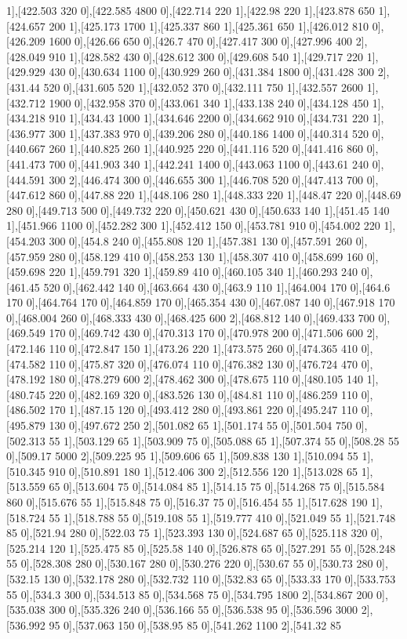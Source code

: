 {1],[422.503 320 0],[422.585 4800 0],[422.714 220 1],[422.98 220 1],[423.878 650 1],[424.657 200 1],[425.173 1700 1],[425.337 860 1],[425.361 650 1],[426.012 810 0],[426.209 1600 0],[426.66 650 0],[426.7 470 0],[427.417 300 0],[427.996 400 2],[428.049 910 1],[428.582 430 0],[428.612 300 0],[429.608 540 1],[429.717 220 1],[429.929 430 0],[430.634 1100 0],[430.929 260 0],[431.384 1800 0],[431.428 300 2],[431.44 520 0],[431.605 520 1],[432.052 370 0],[432.111 750 1],[432.557 2600 1],[432.712 1900 0],[432.958 370 0],[433.061 340 1],[433.138 240 0],[434.128 450 1],[434.218 910 1],[434.43 1000 1],[434.646 2200 0],[434.662 910 0],[434.731 220 1],[436.977 300 1],[437.383 970 0],[439.206 280 0],[440.186 1400 0],[440.314 520 0],[440.667 260 1],[440.825 260 1],[440.925 220 0],[441.116 520 0],[441.416 860 0],[441.473 700 0],[441.903 340 1],[442.241 1400 0],[443.063 1100 0],[443.61 240 0],[444.591 300 2],[446.474 300 0],[446.655 300 1],[446.708 520 0],[447.413 700 0],[447.612 860 0],[447.88 220 1],[448.106 280 1],[448.333 220 1],[448.47 220 0],[448.69 280 0],[449.713 500 0],[449.732 220 0],[450.621 430 0],[450.633 140 1],[451.45 140 1],[451.966 1100 0],[452.282 300 1],[452.412 150 0],[453.781 910 0],[454.002 220 1],[454.203 300 0],[454.8 240 0],[455.808 120 1],[457.381 130 0],[457.591 260 0],[457.959 280 0],[458.129 410 0],[458.253 130 1],[458.307 410 0],[458.699 160 0],[459.698 220 1],[459.791 320 1],[459.89 410 0],[460.105 340 1],[460.293 240 0],[461.45 520 0],[462.442 140 0],[463.664 430 0],[463.9 110 1],[464.004 170 0],[464.6 170 0],[464.764 170 0],[464.859 170 0],[465.354 430 0],[467.087 140 0],[467.918 170 0],[468.004 260 0],[468.333 430 0],[468.425 600 2],[468.812 140 0],[469.433 700 0],[469.549 170 0],[469.742 430 0],[470.313 170 0],[470.978 200 0],[471.506 600 2],[472.146 110 0],[472.847 150 1],[473.26 220 1],[473.575 260 0],[474.365 410 0],[474.582 110 0],[475.87 320 0],[476.074 110 0],[476.382 130 0],[476.724 470 0],[478.192 180 0],[478.279 600 2],[478.462 300 0],[478.675 110 0],[480.105 140 1],[480.745 220 0],[482.169 320 0],[483.526 130 0],[484.81 110 0],[486.259 110 0],[486.502 170 1],[487.15 120 0],[493.412 280 0],[493.861 220 0],[495.247 110 0],[495.879 130 0],[497.672 250 2],[501.082 65 1],[501.174 55 0],[501.504 750 0],[502.313 55 1],[503.129 65 1],[503.909 75 0],[505.088 65 1],[507.374 55 0],[508.28 55 0],[509.17 5000 2],[509.225 95 1],[509.606 65 1],[509.838 130 1],[510.094 55 1],[510.345 910 0],[510.891 180 1],[512.406 300 2],[512.556 120 1],[513.028 65 1],[513.559 65 0],[513.604 75 0],[514.084 85 1],[514.15 75 0],[514.268 75 0],[515.584 860 0],[515.676 55 1],[515.848 75 0],[516.37 75 0],[516.454 55 1],[517.628 190 1],[518.724 55 1],[518.788 55 0],[519.108 55 1],[519.777 410 0],[521.049 55 1],[521.748 85 0],[521.94 280 0],[522.03 75 1],[523.393 130 0],[524.687 65 0],[525.118 320 0],[525.214 120 1],[525.475 85 0],[525.58 140 0],[526.878 65 0],[527.291 55 0],[528.248 55 0],[528.308 280 0],[530.167 280 0],[530.276 220 0],[530.67 55 0],[530.73 280 0],[532.15 130 0],[532.178 280 0],[532.732 110 0],[532.83 65 0],[533.33 170 0],[533.753 55 0],[534.3 300 0],[534.513 85 0],[534.568 75 0],[534.795 1800 2],[534.867 200 0],[535.038 300 0],[535.326 240 0],[536.166 55 0],[536.538 95 0],[536.596 3000 2],[536.992 95 0],[537.063 150 0],[538.95 85 0],[541.262 1100 2],[541.32 85 }
